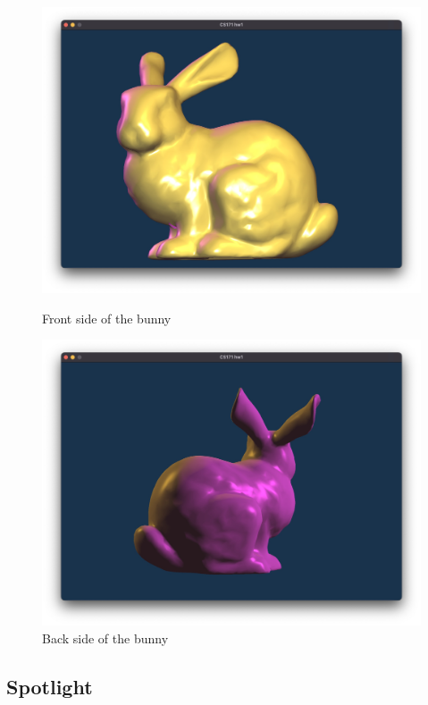 \documentclass[acmtog]{acmart}
\begin{document}
\begin{figure}[H]
	\centering
	\includegraphics[scale=0.08]{pictures/front.jpg}
	\caption{Front side of the bunny}

	\centering
	\includegraphics[scale=0.08]{pictures/back.jpg}
	\caption{Back side of the bunny}
\end{figure}


\pagebreak
\subsection{Spotlight}
\end{document}
